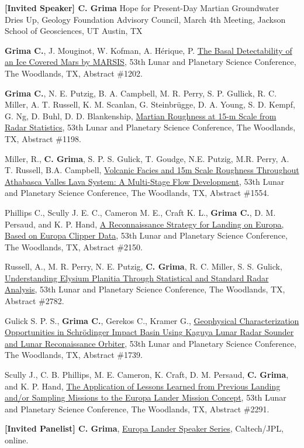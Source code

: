 \begin{etaremune}
  \textbf{[Invited Speaker] C. Grima} Hope for Present-Day Martian Groundwater Dries Up, Geology Foundation Advisory Council, March 4th Meeting, Jackson School of Geosciences, UT Austin, TX
\item
  \textbf{Grima C.}, J. Mouginot, W. Kofman, A. Hérique, P. \href{https://www.hou.usra.edu/meetings/lpsc2022/pdf/1202.pdf}{The Basal Detectability of an Ice Covered Mars by MARSIS}, 53th Lunar and Planetary Science Conference, The Woodlands, TX, Abstract \#1202.
\item
  \textbf{Grima C.}, N. E. Putzig, B. A. Campbell, M. R. Perry, S. P. Gullick, R. C. Miller, A. T. Russell, K. M. Scanlan, G. Steinbrügge, D. A. Young, S. D. Kempf, G. Ng, D. Buhl, D. D. Blankenship, \href{https://www.hou.usra.edu/meetings/lpsc2022/pdf/1198.pdf}{Martian Roughness at 15-m Scale from Radar Statistics}, 53th Lunar and Planetary Science Conference, The Woodlands, TX, Abstract \#1198.
\item
  Miller, R., \textbf{C. Grima}, S. P. S. Gulick, T. Goudge, N.E. Putzig, M.R. Perry, A. T. Russell, B.A. Campbell,  \href{https://www.hou.usra.edu/meetings/lpsc2022/pdf/1554.pdf}{Volcanic Facies and 15m Scale Roughness Throughout Athabasca Valles Lava System: A Multi-Stage Flow Development}, 53th Lunar and Planetary Science Conference, The Woodlands, TX, Abstract \#1554.
\item
  Phillips C., Scully J. E. C., Cameron M. E., Craft K. L., \textbf{Grima C.}, D. M. Persaud, and K. P. Hand, \href{https://www.hou.usra.edu/meetings/lpsc2022/pdf/2150.pdf}{A Reconnaissance Strategy for Landing on Europa, Based on Europa Clipper Data}, 53th Lunar and Planetary Science Conference, The Woodlands, TX, Abstract \#2150.
\item
  Russell, A., M. R. Perry, N. E. Putzig, \textbf{C. Grima}, R. C. Miller, S. S. Gulick, \href{https://www.hou.usra.edu/meetings/lpsc2022/pdf/2782.pdf}{Understanding Elysium Planitia Through Statistical and Standard Radar Analysis}, 53th Lunar and Planetary Science Conference, The Woodlands, TX, Abstract \#2782.
\item
  Gulick S. P. S., \textbf{Grima C.}, Gerekos C., Kramer G., \href{http://www.hou.usra.edu/meetings/lpsc2022/pdf/1739.pdf}{Geophysical Characterization Opportunities in Schrödinger Impact Basin Using Kaguya Lunar Radar Sounder and Lunar Reconaissance Orbiter}, 53th Lunar and Planetary Science Conference, The Woodlands, TX, Abstract \#1739.
\item
  Scully J., C. B. Phillips, M. E. Cameron, K. Craft, D. M. Persaud, \textbf{C. Grima}, and K. P. Hand, \href{https://www.hou.usra.edu/meetings/lpsc2022/pdf/2291.pdf}{The Application of Lessons Learned from Previous Landing and/or Sampling Missions to the Europa Lander Mission Concept}, 53th Lunar and Planetary Science Conference, The Woodlands, TX, Abstract \#2291.
\item
  \textbf{[Invited Panelist] C. Grima}, \href{https://www.europa-insitu.caltech.edu/presentations.html}{Europa Lander Speaker Series}, Caltech/JPL, online.


\end{etaremune}

